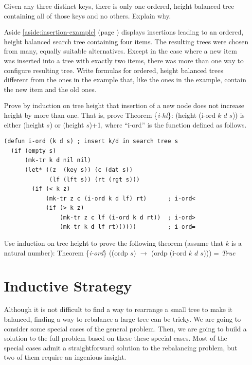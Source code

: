 \begin{ExerciseList}
\Exercise Given any three distinct keys,
there is only one ordered, height balanced tree containing
all of those keys and no others.
Explain why.

\Exercise Aside \ref{aside:insertion-example}
(page \pageref{aside:insertion-example}) displays
insertions leading to an ordered, height balanced search tree
containing four items.
The resulting trees were chosen from many, equally suitable
alternatives.
Except in the case where a new item was inserted into a tree
with exactly two items, there was more than one way to configure
resulting tree.
Write formulas for ordered, height balanced trees different from
the ones in the example that, like the ones in the example, contain
the new item and the old ones.

\Exercise Prove by induction on tree height
that insertion of a new node does not increase height by more than one.
\label{thm:i-ht}
That is, prove Theorem \{\emph{i-ht}\}: (height (i-ord $k$ $d$ $s$))
is either (height $s$) or (height $s$)+1, where ``i-ord''
is the function defined as follows.
\label{defun:i-ord}
\begin{center}
\begin{Verbatim}
(defun i-ord (k d s) ; insert k/d in search tree s
  (if (empty s)
      (mk-tr k d nil nil)
      (let* ((z  (key s)) (c (dat s))
             (lf (lft s)) (rt (rgt s)))
        (if (< k z)
            (mk-tr z c (i-ord k d lf) rt)      ; i-ord<
            (if (> k z)
                (mk-tr z c lf (i-ord k d rt))  ; i-ord>
                (mk-tr k d lf rt))))))         ; i-ord=
\end{Verbatim}
\end{center}

\Exercise Use induction on tree height to prove the following theorem
(assume that $k$ is a natural number):
\label{thm:i-ord}
Theorem \{\emph{i-ord}\}
((ordp $s$) $\rightarrow$ (ordp (i-ord $k$ $d$ $s$))) = \emph{True}

\end{ExerciseList}

\section{Inductive Strategy}
Although it is not difficult to find a way to rearrange a small
tree to make it balanced, finding a way to rebalance a large tree can be
tricky. We are going to consider some special cases of the general
problem.  Then, we are going to build a solution to the full
problem based on these these special cases. Most of the special cases
admit a straightforward solution to the rebalancing problem, but
two of them require an ingenious insight.

